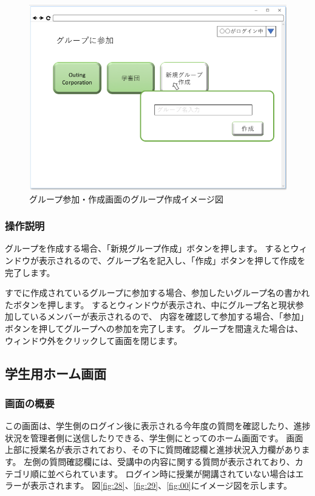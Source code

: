 \begin{figure}[htbp]
\begin{center}
  \includegraphics[width=1\linewidth,clip]{./img/27.png}
  \caption{グループ参加・作成画面のグループ作成イメージ図}\label{fig:27}
\end{center}
\end{figure}

\subsubsection{操作説明}
グループを作成する場合、「新規グループ作成」ボタンを押します。
するとウィンドウが表示されるので、グループ名を記入し、「作成」ボタンを押して作成を完了します。

すでに作成されているグループに参加する場合、参加したいグループ名の書かれたボタンを押します。
するとウィンドウが表示され、中にグループ名と現状参加しているメンバーが表示されるので、
内容を確認して参加する場合、「参加」ボタンを押してグループへの参加を完了します。
グループを間違えた場合は、ウィンドウ外をクリックして画面を閉じます。

\newpage

\subsection{学生用ホーム画面}
\subsubsection{画面の概要}
この画面は、学生側のログイン後に表示される今年度の質問を確認したり、進捗状況を管理者側に送信したりできる、学生側にとってのホーム画面です。
画面上部に授業名が表示されており、その下に質問確認欄と進捗状況入力欄があります。
左側の質問確認欄には、受講中の内容に関する質問が表示されており、カテゴリ順に並べられています。
ログイン時に授業が開講されていない場合はエラーが表示されます。
図\ref{fig:28}、\ref{fig:29}、\ref{fig:00}にイメージ図を示します。

